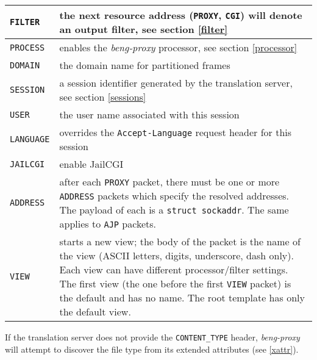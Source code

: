 \documentclass[a4paper,12pt]{article}
\begin{document}
\begin{tabular}{|l|p{10cm}|}
\hline

\texttt{FILTER} & the next resource address (\texttt{PROXY},
\texttt{CGI}) will denote an output filter, see section \ref{filter}
\\

\hline

\texttt{PROCESS} & enables the \emph{beng-proxy} processor, see
section \ref{processor} \\

\hline

\texttt{DOMAIN} & the domain name for partitioned frames \\

\hline

\texttt{SESSION} & a session identifier generated by the translation
server, see section \ref{sessions} \\

\hline

\texttt{USER} & the user name associated with this session \\

\hline

\texttt{LANGUAGE} & overrides the \texttt{Accept-Language} request
header for this session \\
\hline

\texttt{JAILCGI} & enable JailCGI \\

\hline

\texttt{ADDRESS} & after each \texttt{PROXY} packet, there must be one
or more \texttt{ADDRESS} packets which specify the resolved addresses.
The payload of each is a \texttt{struct sockaddr}.
The same applies to \texttt{AJP} packets. \\

\hline

\texttt{VIEW} & starts a new view; the body of the packet is the name
of the view (ASCII letters, digits, underscore, dash only).  Each view
can have different processor/filter settings.  The first view (the one
before the first \texttt{VIEW} packet) is the default and has no
name.  The root template has only the default view. \\

\hline
\end{tabular}

If the translation server does not provide the \texttt{CONTENT\_TYPE}
header, \emph{beng-proxy} will attempt to discover the file type from
its extended attributes (see \ref{xattr}).
\end{document}
